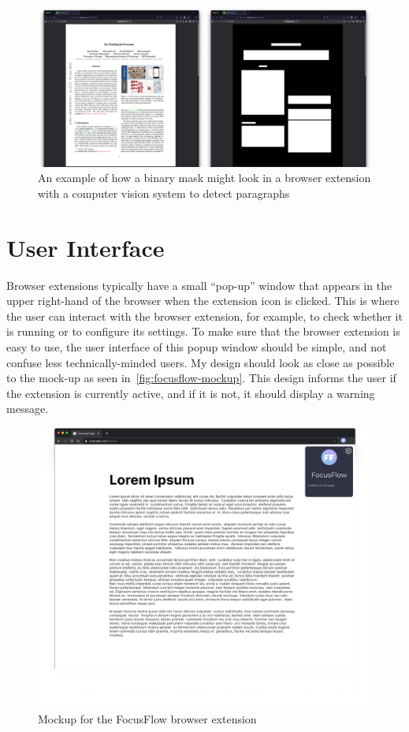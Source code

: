 \documentclass{report}
\begin{document}
\begin{figure}
    \centering
    \includegraphics[scale=0.1]{../assets/binary-mask.png}
    \caption{An example of how a binary mask might look in a browser extension with a computer vision system to detect paragraphs}
\end{figure}

\section{User Interface} 

Browser extensions typically have a small ``pop-up'' window that appears in the upper right-hand of the browser when the extension icon is clicked. This is where the user can interact with the browser extension, for example, to check whether it is running or to configure its settings. To make sure that the browser extension is easy to use, the user interface of this popup window should be simple, and not confuse less technically-minded users. My design should look as close as possible to the mock-up as seen in~\autoref{fig:focusflow-mockup}. This design informs the user if the extension is currently active, and if it is not, it should display a warning message. 

\begin{figure}
    \begin{center}
        \includegraphics[scale=0.25]{../assets/user-interface-design.png}
    \end{center}
    \caption{Mockup for the FocusFlow browser extension}
    \label{fig:focusflow-mockup}
\end{figure}
\end{document}
